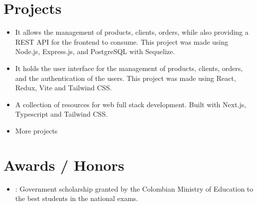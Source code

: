 \documentclass[]{rahulworld-resume}
\begin{document}
\begin{minipage}[t]{0.66\textwidth}
    \section{Projects}

    \begin{itemize}
        \item
              \href{https://github.com/Ide-Pinturerias/pinturas-app-back}{} It allows the management of products, clients,
              orders, while also providing a REST API for the frontend to consume. This
              project was made using Node.js, Express.js, and PostgreSQL with Sequelize.

        \item
              \href{https://pinturas-app-front.vercel.app/}
              {} It holds the user
              interface for the management of products, clients, orders, and
              the authentication of the users. This project was made using
              React, Redux, Vite and Tailwind CSS.



        \item \href{https://resources-app.vercel.app/}{} A collection of resources for web full stack development. Built with
              Next.js, Typescript and Tailwind CSS.

        \item More projects
              \href{https://jamerrq-com.vercel.app/projects}{}

    \end{itemize}

    \section{Awards / Honors}

    \begin{itemize}
        \item {}: Government scholarship granted by the
              Colombian Ministry of Education to the best students in the national exams.
    \end{itemize}
\end{minipage}
\end{document}
